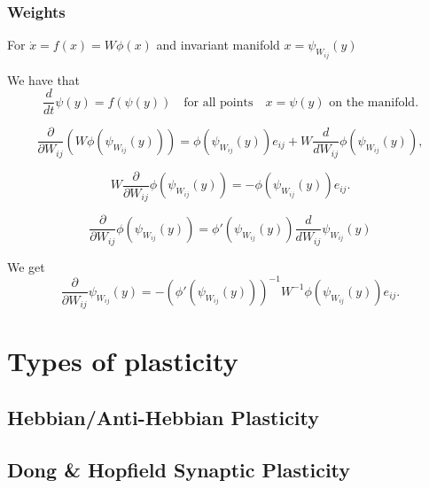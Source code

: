 \documentclass{article}
\theoremstyle{definition} \newtheorem{definition}{Definition}
\theoremstyle{remark} \newtheorem{remark}{Remark}
\newcounter{ct}
\begin{document}
\subsubsection{Weights}
For $\dot x= f(x) =W\phi(x)$ and invariant manifold $x=\psi_{W_{ij}}(y)$

We have that 
\begin{equation}
\frac{d}{dt} \psi(y) =f(\psi(y)) \quad \text{for all points} \quad x = \psi(y) \text{ on the manifold}.
\end{equation}

\begin{equation}
\frac{\partial}{\partial W_{ij}} \left( W \phi(\psi_{W_{ij}}(y)) \right) = \phi(\psi_{W_{ij}}(y)) e_{ij} + W \frac{d}{dW_{ij}} \phi(\psi_{W_{ij}}(y)),
\end{equation}

\begin{equation}
W \frac{\partial}{\partial W_{ij}}  \phi(\psi_{W_{ij}}(y)) = - \phi(\psi_{W_{ij}}(y)) e_{ij}.
\end{equation}


\begin{equation}
\frac{\partial}{\partial W_{ij}}  \phi(\psi_{W_{ij}}(y)) = \phi'(\psi_{W_{ij}}(y))\frac{d}{dW_{ij}}\psi_{W_{ij}}(y)
\end{equation}

We get 
\begin{equation}
\frac{\partial}{\partial W_{ij}} \psi_{W_{ij}}(y) = - \left(\phi'(\psi_{W_{ij}}(y))\right)^{-1} W^{-1} \phi(\psi_{W_{ij}}(y)) e_{ij}.
\end{equation}





\newpage
%




\newpage
\appendix

\section{Types of plasticity}
\subsection{Hebbian/Anti-Hebbian Plasticity}
\subsection{Dong \& Hopfield Synaptic Plasticity}
\end{document}

